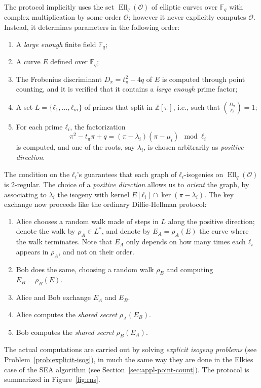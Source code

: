 \documentclass[10pt]{article}
\theoremstyle{plain}
\theoremstyle{definition}
\DeclareMathOperator{\Ell}{Ell}
\def\F{\ensuremath{\mathbb{F}}}
\def\O{\ensuremath{\mathcal{O}}}
\begin{document}
The protocol implicitly uses the set $\Ell_q(\O)$ of elliptic curves
over $\F_q$ with complex multiplication by some order $\O$; however it
never explicitly computes $\O$. %
Instead, it determines parameters in the following order:
\begin{enumerate}
\item A \emph{large enough} finite field $\F_q$;
\item A curve $E$ defined over $\F_q$;
\item The Frobenius discriminant $D_π=t_π^2-4q$ of $E$ is computed
  through point counting, and it is verified that it contains a
  \emph{large enough} prime factor;
\item A set $L=\{ℓ_1,\dots,ℓ_m\}$ of primes that split in $ℤ[π]$,
  i.e., such that $\left(\frac{D_π}{ℓ_i}\right)=1$;
\item For each prime $ℓ_i$, the factorization
  \[π^2-t_ππ+q=(π-λ_i)(π-μ_i)\mod ℓ_i\] %
  is computed, and one of the roots, say $λ_i$, is chosen arbitrarily
  as \emph{positive direction}.
\end{enumerate}

The condition on the $ℓ_i$'s guarantees that each graph of
$ℓ_i$-isogenies on $\Ell_q(\O)$ is $2$-regular. %
The choice of a \emph{positive direction} allows us to \emph{orient}
the graph, by associating to $λ_i$ the isogeny with kernel
$E[ℓ_i]∩\ker(π-λ_i)$. %
The key exchange now proceeds like the ordinary Diffie-Hellman
protocol:
\begin{enumerate}
\item Alice chooses a random walk made of steps in $L$ along the
  positive direction; denote the walk by $ρ_A∈L^*$, and denote by
  $E_A=ρ_A(E)$ the curve where the walk terminates. %
  Note that $E_A$ only depends on how many times each $ℓ_i$ appears in
  $ρ_A$, and not on their order.
\item Bob does the same, choosing a random walk $ρ_B$ and computing
  $E_B=ρ_B(E)$.
\item Alice and Bob exchange $E_A$ and $E_B$.
\item Alice computes the \emph{shared secret} $ρ_A(E_B)$.
\item Bob computes the \emph{shared secret} $ρ_B(E_A)$.
\end{enumerate}
The actual computations are carried out by solving \emph{explicit
  isogeny problems} (see Problem~\ref{prob:explicit-isog}), in much
the same way they are done in the Elkies case of the SEA algorithm
(see Section~\ref{sec:appl-point-count}). %
The protocol is summarized in Figure~\ref{fig:rns}.
\end{document}
